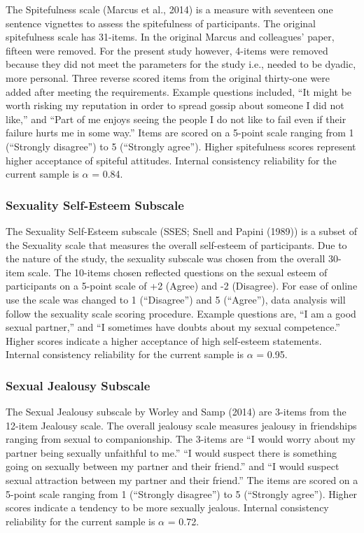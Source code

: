 \documentclass[
  english,
  a4paper,floatsintext]{apa7}
\begin{document}
The Spitefulness scale (Marcus et al., 2014) is a measure with seventeen one sentence vignettes to assess the spitefulness of participants. The original spitefulness scale has 31-items. In the original Marcus and colleagues' paper, fifteen were removed. For the present study however, 4-items were removed because they did not meet the parameters for the study i.e., needed to be dyadic, more personal. Three reverse scored items from the original thirty-one were added after meeting the requirements. Example questions included, ``It might be worth risking my reputation in order to spread gossip about someone I did not like,'' and ``Part of me enjoys seeing the people I do not like to fail even if their failure hurts me in some way.'' Items are scored on a 5-point scale ranging from 1 (``Strongly disagree'') to 5 (``Strongly agree''). Higher spitefulness scores represent higher acceptance of spiteful attitudes. Internal consistency reliability for the current sample is \(\alpha\) = 0.84.

\hypertarget{sexuality-self-esteem-subscale}{%
\subsubsection{Sexuality Self-Esteem Subscale}\label{sexuality-self-esteem-subscale}}

The Sexuality Self-Esteem subscale (SSES; Snell and Papini (1989)) is a subset of the Sexuality scale that measures the overall self-esteem of participants. Due to the nature of the study, the sexuality subscale was chosen from the overall 30-item scale. The 10-items chosen reflected questions on the sexual esteem of participants on a 5-point scale of +2 (Agree) and -2 (Disagree). For ease of online use the scale was changed to 1 (``Disagree'') and 5 (``Agree''), data analysis will follow the sexuality scale scoring procedure. Example questions are, ``I am a good sexual partner,'' and ``I sometimes have doubts about my sexual competence.'' Higher scores indicate a higher acceptance of high self-esteem statements. Internal consistency reliability for the current sample is \(\alpha\) = 0.95.

\hypertarget{sexual-jealousy-subscale}{%
\subsubsection{Sexual Jealousy Subscale}\label{sexual-jealousy-subscale}}

The Sexual Jealousy subscale by Worley and Samp (2014) are 3-items from the 12-item Jealousy scale. The overall jealousy scale measures jealousy in friendships ranging from sexual to companionship. The 3-items are ``I would worry about my partner being sexually unfaithful to me.'' ``I would suspect there is something going on sexually between my partner and their friend.'' and ``I would suspect sexual attraction between my partner and their friend.'' The items are scored on a 5-point scale ranging from 1 (``Strongly disagree'') to 5 (``Strongly agree''). Higher scores indicate a tendency to be more sexually jealous. Internal consistency reliability for the current sample is \(\alpha\) = 0.72.
\end{document}
